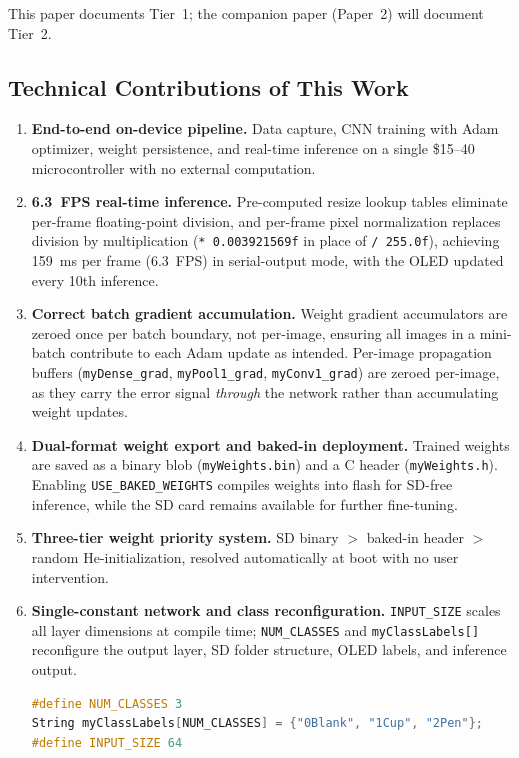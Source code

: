 \documentclass[12pt]{article}
\begin{document}
This paper documents Tier~1;
the companion paper (Paper~2) will document Tier~2.

\subsection{Technical Contributions of This Work}
\label{subsec:contributions}
\begin{enumerate}
  \item \textbf{End-to-end on-device pipeline.}
        Data capture, CNN training with Adam optimizer, weight persistence, and
        real-time inference on a single \$15--40 microcontroller with no
        external computation.

  \item \textbf{6.3~FPS real-time inference.}
        Pre-computed resize lookup tables eliminate per-frame floating-point
        division, and per-frame pixel normalization replaces division by
        multiplication (\texttt{*~0.003921569f} in place of \texttt{/~255.0f}),
        achieving 159~ms per frame (6.3~FPS) in serial-output mode,
        with the OLED updated every 10th inference.

  \item \textbf{Correct batch gradient accumulation.}
        Weight gradient accumulators are zeroed once per batch boundary, not
        per-image, ensuring all images in a mini-batch contribute to each
        Adam update as intended.
        Per-image propagation buffers (\texttt{myDense\_grad},
        \texttt{myPool1\_grad}, \texttt{myConv1\_grad}) are zeroed per-image,
        as they carry the error signal \emph{through} the network rather than
        accumulating weight updates.

  \item \textbf{Dual-format weight export and baked-in deployment.}
        Trained weights are saved as a binary blob (\texttt{myWeights.bin}) and
        a C header (\texttt{myWeights.h}).
        Enabling \texttt{USE\_BAKED\_WEIGHTS} compiles weights into flash for
        SD-free inference, while the SD card remains available for further
        fine-tuning.

  \item \textbf{Three-tier weight priority system.}
        SD binary $>$ baked-in header $>$ random He-initialization, resolved
        automatically at boot with no user intervention.

  \item \textbf{Single-constant network and class reconfiguration.}
        \texttt{INPUT\_SIZE} scales all layer dimensions at compile time;
        \texttt{NUM\_CLASSES} and \texttt{myClassLabels[]} reconfigure the
        output layer, SD folder structure, OLED labels, and inference output.
        \begin{lstlisting}[language=C++]
#define NUM_CLASSES 3
String myClassLabels[NUM_CLASSES] = {"0Blank", "1Cup", "2Pen"};
#define INPUT_SIZE 64
        \end{lstlisting}


\end{enumerate}
\end{document}
